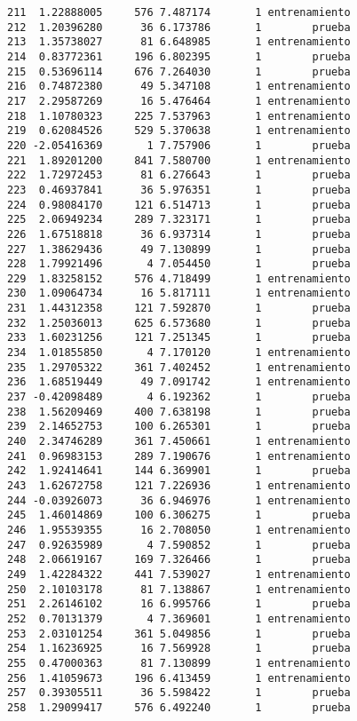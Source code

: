 \documentclass[
  letterpaper,
  DIV=11,
  numbers=noendperiod]{scrreprt}
\begin{document}
\begin{verbatim}
211  1.22888005     576 7.487174       1 entrenamiento
212  1.20396280      36 6.173786       1        prueba
213  1.35738027      81 6.648985       1 entrenamiento
214  0.83772361     196 6.802395       1        prueba
215  0.53696114     676 7.264030       1        prueba
216  0.74872380      49 5.347108       1 entrenamiento
217  2.29587269      16 5.476464       1 entrenamiento
218  1.10780323     225 7.537963       1 entrenamiento
219  0.62084526     529 5.370638       1 entrenamiento
220 -2.05416369       1 7.757906       1        prueba
221  1.89201200     841 7.580700       1 entrenamiento
222  1.72972453      81 6.276643       1        prueba
223  0.46937841      36 5.976351       1        prueba
224  0.98084170     121 6.514713       1        prueba
225  2.06949234     289 7.323171       1        prueba
226  1.67518818      36 6.937314       1        prueba
227  1.38629436      49 7.130899       1        prueba
228  1.79921496       4 7.054450       1        prueba
229  1.83258152     576 4.718499       1 entrenamiento
230  1.09064734      16 5.817111       1 entrenamiento
231  1.44312358     121 7.592870       1        prueba
232  1.25036013     625 6.573680       1        prueba
233  1.60231256     121 7.251345       1        prueba
234  1.01855850       4 7.170120       1 entrenamiento
235  1.29705322     361 7.402452       1 entrenamiento
236  1.68519449      49 7.091742       1 entrenamiento
237 -0.42098489       4 6.192362       1        prueba
238  1.56209469     400 7.638198       1        prueba
239  2.14652753     100 6.265301       1        prueba
240  2.34746289     361 7.450661       1 entrenamiento
241  0.96983153     289 7.190676       1 entrenamiento
242  1.92414641     144 6.369901       1        prueba
243  1.62672758     121 7.226936       1 entrenamiento
244 -0.03926073      36 6.946976       1 entrenamiento
245  1.46014869     100 6.306275       1        prueba
246  1.95539355      16 2.708050       1 entrenamiento
247  0.92635989       4 7.590852       1        prueba
248  2.06619167     169 7.326466       1        prueba
249  1.42284322     441 7.539027       1 entrenamiento
250  2.10103178      81 7.138867       1 entrenamiento
251  2.26146102      16 6.995766       1        prueba
252  0.70131379       4 7.369601       1 entrenamiento
253  2.03101254     361 5.049856       1        prueba
254  1.16236925      16 7.569928       1        prueba
255  0.47000363      81 7.130899       1 entrenamiento
256  1.41059673     196 6.413459       1 entrenamiento
257  0.39305511      36 5.598422       1        prueba
258  1.29099417     576 6.492240       1        prueba

\end{verbatim}
\end{document}
